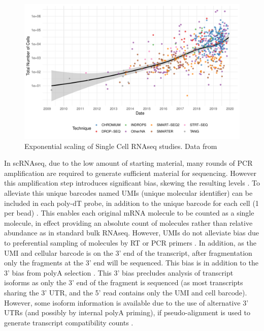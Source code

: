 \begin{figure}[H]
	\centering
	\includegraphics[width=\textwidth]{figures/intro/scStudies.pdf}
	\caption[scRNAseq Publications]{Exponential scaling of Single Cell RNAseq studies. Data from~\cite{Svensson2019curated}}
	\label{fig:scStudies}
\end{figure}

In scRNAseq, due to the low amount of starting material, many rounds of PCR amplification are required to generate sufficient material for sequencing. However this amplification step introduces significant bias, skewing the resulting levels \parencite{Best2015Computational}. To alleviate this unique barcodes named UMIs (unique molecular identifier) can be included in each poly-dT probe, in addition to the unique barcode for each cell (1 per bead) \parencite{Kivioja2012Counting,Islam2014Quantitative}. This enables each original mRNA molecule to be counted as a single molecule, in effect providing an absolute count of molecules rather than relative abundance as in standard bulk RNAseq. However, UMIs do not alleviate bias due to preferential sampling of molecules by RT or PCR primers \parencite{Kou2016Benefits}. In addition, as the UMI and cellular barcode is on the 3' end of the transcript, after fragmentation only the fragments at the 3' end will be sequenced. This bias is in addition to the 3' bias from polyA selection \parencite{Wan2012Modeling, Lahens2014IVTseq}. This 3' bias precludes analysis of transcript isoforms as only the 3' end of the fragment is sequenced (as most transcripts sharing the 3' UTR, and the 5' read contains only the UMI and cell barcode). However, some isoform information is available due to the use of alternative 3' UTRs (and possibly by internal polyA priming), if pseudo-alignment is used to generate transcript compatibility counts \parencite{Nam2002Oligo, Ntranos2019discriminative}.

